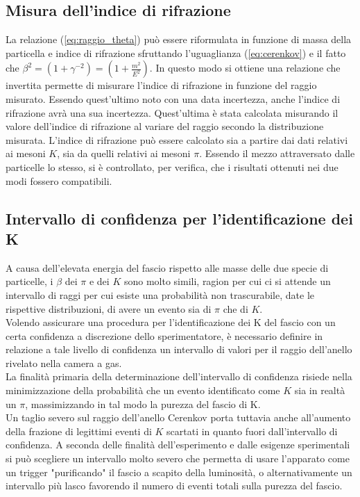 \documentclass[8pt]{extarticle}
\begin{document}
\subsection{Misura dell'indice di rifrazione}
La relazione (\eqref{eq:raggio_theta}) può essere riformulata in funzione di massa della particella e indice di rifrazione sfruttando l'uguaglianza (\eqref{eq:cerenkov}) e il fatto che $\beta^2=(1+\gamma^{-2})=(1+\frac{m^2}{E^2})$. In questo modo si ottiene una relazione che invertita permette di misurare l'indice di rifrazione in funzione del raggio misurato. Essendo quest'ultimo noto con una data incertezza, anche l'indice di rifrazione avrà una sua incertezza. Quest'ultima è stata calcolata misurando il valore dell'indice di rifrazione al variare del raggio secondo la distribuzione misurata. L'indice di rifrazione può essere calcolato sia a partire dai dati relativi ai mesoni $K$, sia da quelli relativi ai mesoni $\pi$. Essendo il mezzo attraversato dalle particelle lo stesso, si è controllato, per verifica, che i risultati ottenuti nei due modi fossero compatibili.

\subsection{Intervallo di confidenza per l'identificazione dei K}
A causa dell'elevata energia del fascio rispetto alle masse delle due specie di particelle, i $\beta$ dei $\pi$ e dei $K$ sono molto simili, ragion per cui ci si attende un intervallo di raggi per cui esiste una probabilità non trascurabile, date le rispettive distribuzioni, di avere un evento sia di $\pi$ che di $K$.\\
Volendo assicurare una procedura per l'identificazione dei K del fascio con un certa confidenza a discrezione dello sperimentatore, è necessario definire in relazione a tale livello di confidenza un intervallo di valori per il raggio dell'anello rivelato nella camera a gas.\\
La finalità primaria della determinazione dell'intervallo di confidenza risiede nella minimizzazione della probabilità che un evento identificato come $K$ sia in realtà un $\pi$, massimizzando in tal modo la purezza del fascio di K.\\
Un taglio severo sul raggio dell'anello Cerenkov porta tuttavia anche all'aumento della frazione di legittimi eventi di $K$ scartati in quanto fuori dall'intervallo di confidenza. A seconda delle finalità dell'esperimento e dalle esigenze sperimentali si può scegliere un intervallo molto severo che permetta di usare l'apparato come un trigger "purificando" il fascio a scapito della luminosità, o alternativamente un intervallo più lasco favorendo il numero di eventi totali sulla purezza del fascio.
\end{document}

